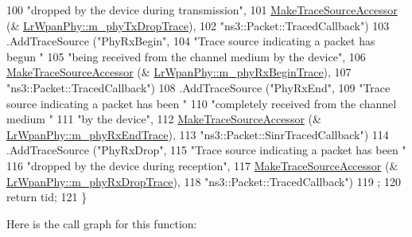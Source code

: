 \begin{DoxyCode}
100                      \textcolor{stringliteral}{"dropped by the device during transmission"},
101                      \hyperlink{group__tracing_gab21a770b9855af4e8f69f7531ea4a6b0}{MakeTraceSourceAccessor} (&
      \hyperlink{classns3_1_1LrWpanPhy_ac8651acbf8f744b8442c05a490a35720}{LrWpanPhy::m\_phyTxDropTrace}),
102                      \textcolor{stringliteral}{"ns3::Packet::TracedCallback"})
103     .AddTraceSource (\textcolor{stringliteral}{"PhyRxBegin"},
104                      \textcolor{stringliteral}{"Trace source indicating a packet has begun "}
105                      \textcolor{stringliteral}{"being received from the channel medium by the device"},
106                      \hyperlink{group__tracing_gab21a770b9855af4e8f69f7531ea4a6b0}{MakeTraceSourceAccessor} (&
      \hyperlink{classns3_1_1LrWpanPhy_acd238a82f3646333c30a9100fecafbda}{LrWpanPhy::m\_phyRxBeginTrace}),
107                      \textcolor{stringliteral}{"ns3::Packet::TracedCallback"})
108     .AddTraceSource (\textcolor{stringliteral}{"PhyRxEnd"},
109                      \textcolor{stringliteral}{"Trace source indicating a packet has been "}
110                      \textcolor{stringliteral}{"completely received from the channel medium "}
111                      \textcolor{stringliteral}{"by the device"},
112                      \hyperlink{group__tracing_gab21a770b9855af4e8f69f7531ea4a6b0}{MakeTraceSourceAccessor} (&
      \hyperlink{classns3_1_1LrWpanPhy_a6d8ee60f128cdce862893fc9e0e5eda3}{LrWpanPhy::m\_phyRxEndTrace}),
113                      \textcolor{stringliteral}{"ns3::Packet::SinrTracedCallback"})
114     .AddTraceSource (\textcolor{stringliteral}{"PhyRxDrop"},
115                      \textcolor{stringliteral}{"Trace source indicating a packet has been "}
116                      \textcolor{stringliteral}{"dropped by the device during reception"},
117                      \hyperlink{group__tracing_gab21a770b9855af4e8f69f7531ea4a6b0}{MakeTraceSourceAccessor} (&
      \hyperlink{classns3_1_1LrWpanPhy_aa649b07e1ef1151e1758c5091e6a7a00}{LrWpanPhy::m\_phyRxDropTrace}),
118                      \textcolor{stringliteral}{"ns3::Packet::TracedCallback"})
119   ;
120   \textcolor{keywordflow}{return} tid;
121 \}
\end{DoxyCode}


Here is the call graph for this function\+:


